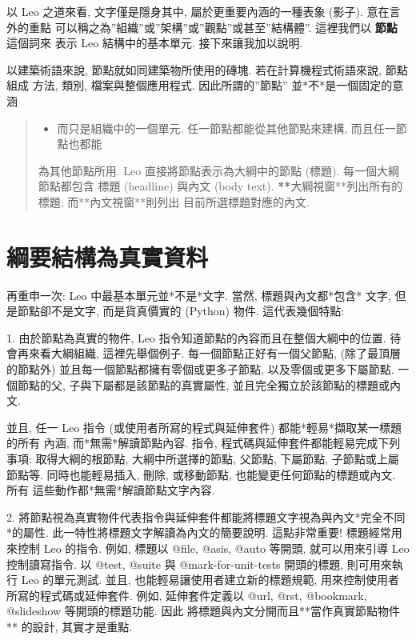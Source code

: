 \documentclass[a4paper,10pt,english]{sphinxmanual}
\begin{document}
以 Leo 之道來看, 文字僅是隱身其中, 屬於更重要內涵的一種表象 (影子). 意在言外的重點
可以稱之為''組織''或''架構''或''觀點''或甚至''結構體''. 這裡我們以 \textbf{節點} 這個詞來
表示 Leo 結構中的基本單元. 接下來讓我加以說明.

以建築術語來說, 節點就如同建築物所使用的磚塊. 若在計算機程式術語來說, 節點組成
方法, 類別, 檔案與整個應用程式. 因此所謂的''節點'' 並*不*是一個固定的意涵
\begin{quote}
\begin{itemize}
\item {} 
而只是組織中的一個單元. 任一節點都能從其他節點來建構, 而且任一節點也都能

\end{itemize}

為其他節點所用. Leo 直接將節點表示為大綱中的節點 (標題). 每一個大綱節點都包含
標題 (headline) 與內文 (body text).  {\color{red}\bfseries{}**}大綱視窗**列出所有的標題; 而**內文視窗**則列出
目前所選標題對應的內文.
\end{quote}


\section{綱要結構為真實資料}
\label{preface:id4}\label{preface:using-the-rst3-plugin}
再重申一次: Leo 中最基本單元並*不是*文字. 當然, 標題與內文都*包含*
文字, 但是節點卻不是文字, 而是貨真價實的 (Python) 物件.
這代表幾個特點:

1. 由於節點為真實的物件, Leo 指令知道節點的內容而且在整個大綱中的位置.
待會再來看大綱組織, 這裡先舉個例子. 每一個節點正好有一個父節點, (除了最頂層的節點外)
並且每一個節點都擁有零個或更多子節點, 以及零個或更多下屬節點.
一個節點的父, 子與下屬都是該節點的真實屬性, 並且完全獨立於該節點的標題或內文.

並且, 任一 Leo 指令 (或使用者所寫的程式與延伸套件) 都能*輕易*擷取某一標題的所有
內涵, 而*無需*解讀節點內容. 指令, 程式碼與延伸套件都能輕易完成下列事項:
取得大綱的根節點, 大綱中所選擇的節點, 父節點, 下屬節點, 子節點或上屬節點等.
同時也能輕易插入, 刪除, 或移動節點, 也能變更任何節點的標題或內文. 所有
這些動作都*無需*解讀節點文字內容.

2. 將節點視為真實物件代表指令與延伸套件都能將標題文字視為與內文*完全不同*的屬性.
此一特性將標題文字解讀為內文的簡要說明. 這點非常重要! 標題經常用來控制 Leo 的指令.
例如, 標題以 @file, @asis, @auto 等開頭, 就可以用來引導 Leo 控制讀寫指令.
以 @test, @suite 與 @mark-for-unit-tests 開頭的標題, 則可用來執行 Leo 的單元測試.
並且, 也能輕易讓使用者建立新的標題規範, 用來控制使用者所寫的程式碼或延伸套件.
例如, 延伸套件定義以 @url, @rst, @bookmark, @slideshow 等開頭的標題功能. 因此
將標題與內文分開而且**當作真實節點物件** 的設計, 其實才是重點.
\end{document}
